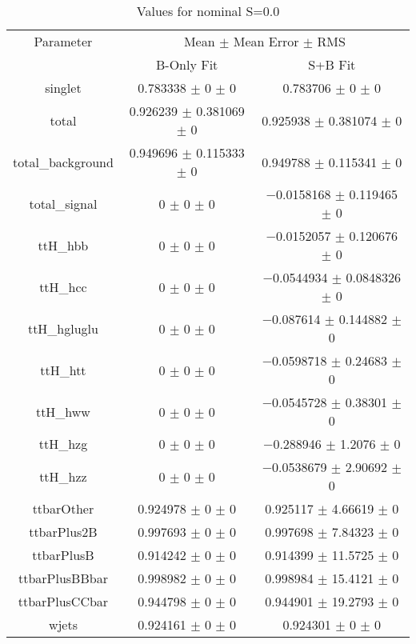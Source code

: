\begin{table}
\centering
\caption{Values for nominal S=0.0}
\begin{tabular}{ccc}
\toprule
Parameter & \multicolumn{2}{c}{Mean $\pm$ Mean Error $\pm$ RMS}\\
 & B-Only Fit & S+B Fit\\
\midrule
singlet & \num{0.783338} $\pm$ \num{0} $\pm$ \num{0} & \num{0.783706} $\pm$ \num{0} $\pm$ \num{0}\\
total & \num{0.926239} $\pm$ \num{0.381069} $\pm$ \num{0} & \num{0.925938} $\pm$ \num{0.381074} $\pm$ \num{0}\\
total\_background & \num{0.949696} $\pm$ \num{0.115333} $\pm$ \num{0} & \num{0.949788} $\pm$ \num{0.115341} $\pm$ \num{0}\\
total\_signal & \num{0} $\pm$ \num{0} $\pm$ \num{0} & \num{-0.0158168} $\pm$ \num{0.119465} $\pm$ \num{0}\\
ttH\_hbb & \num{0} $\pm$ \num{0} $\pm$ \num{0} & \num{-0.0152057} $\pm$ \num{0.120676} $\pm$ \num{0}\\
ttH\_hcc & \num{0} $\pm$ \num{0} $\pm$ \num{0} & \num{-0.0544934} $\pm$ \num{0.0848326} $\pm$ \num{0}\\
ttH\_hgluglu & \num{0} $\pm$ \num{0} $\pm$ \num{0} & \num{-0.087614} $\pm$ \num{0.144882} $\pm$ \num{0}\\
ttH\_htt & \num{0} $\pm$ \num{0} $\pm$ \num{0} & \num{-0.0598718} $\pm$ \num{0.24683} $\pm$ \num{0}\\
ttH\_hww & \num{0} $\pm$ \num{0} $\pm$ \num{0} & \num{-0.0545728} $\pm$ \num{0.38301} $\pm$ \num{0}\\
ttH\_hzg & \num{0} $\pm$ \num{0} $\pm$ \num{0} & \num{-0.288946} $\pm$ \num{1.2076} $\pm$ \num{0}\\
ttH\_hzz & \num{0} $\pm$ \num{0} $\pm$ \num{0} & \num{-0.0538679} $\pm$ \num{2.90692} $\pm$ \num{0}\\
ttbarOther & \num{0.924978} $\pm$ \num{0} $\pm$ \num{0} & \num{0.925117} $\pm$ \num{4.66619} $\pm$ \num{0}\\
ttbarPlus2B & \num{0.997693} $\pm$ \num{0} $\pm$ \num{0} & \num{0.997698} $\pm$ \num{7.84323} $\pm$ \num{0}\\
ttbarPlusB & \num{0.914242} $\pm$ \num{0} $\pm$ \num{0} & \num{0.914399} $\pm$ \num{11.5725} $\pm$ \num{0}\\
ttbarPlusBBbar & \num{0.998982} $\pm$ \num{0} $\pm$ \num{0} & \num{0.998984} $\pm$ \num{15.4121} $\pm$ \num{0}\\
ttbarPlusCCbar & \num{0.944798} $\pm$ \num{0} $\pm$ \num{0} & \num{0.944901} $\pm$ \num{19.2793} $\pm$ \num{0}\\
wjets & \num{0.924161} $\pm$ \num{0} $\pm$ \num{0} & \num{0.924301} $\pm$ \num{0} $\pm$ \num{0}\\
\bottomrule
\end{tabular}
\end{table}